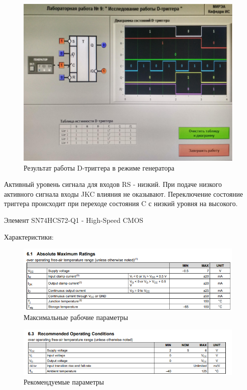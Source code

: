 \begin{figure}[H]
	\centering
	\includegraphics[width=0.95\linewidth]{imgs/9/2}
	\caption{Результат работы D-триггера в режиме генератора}
	\label{fig:9_2}
\end{figure}

Активный уровень сигнала для входов RS - низкий.
При подаче низкого активного сигнала входы JKC влияния не оказывают.
Переключение состояние триггера происходит при переходе состояния C с низкий уровня на высокого.

Элемент SN74HCS72-Q1 - High-Speed CMOS

Характеристики:

\begin{figure}[H]
	\centering
	\includegraphics[width=0.95\linewidth]{imgs/9/ti1}
	\caption{Максимальные рабочие параметры}
	\label{fig:9_ti1}
\end{figure}

\begin{figure}[H]
	\centering
	\includegraphics[width=0.95\linewidth]{imgs/9/ti2}
	\caption{Рекомендуемые параметры}
	\label{fig:9_ti2}
\end{figure}

